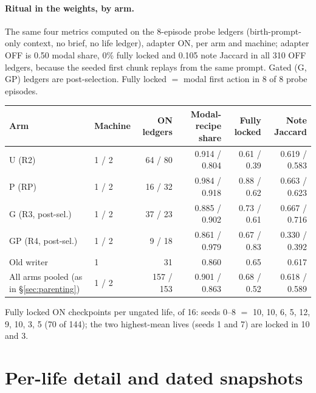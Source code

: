 \documentclass{article}
\begin{document}
\paragraph{Ritual in the weights, by arm.} The same four metrics computed on the 8-episode probe ledgers (birth-prompt-only context, no brief, no life ledger), adapter ON, per arm and machine; adapter OFF is 0.50 modal share, 0\% fully locked and 0.105 note Jaccard in all 310 OFF ledgers, because the seeded first chunk replays from the same prompt. Gated (G, GP) ledgers are post-selection. Fully locked $=$ modal first action in 8 of 8 probe episodes.
\begin{center}\footnotesize
\begin{tabular}{llrrrr}
\toprule
Arm & Machine & ON ledgers & Modal-recipe share & Fully locked & Note Jaccard \\
\midrule
U (R2) & 1 / 2 & 64 / 80 & 0.914 / 0.804 & 0.61 / 0.39 & 0.619 / 0.583 \\
P (RP) & 1 / 2 & 16 / 32 & 0.984 / 0.918 & 0.88 / 0.62 & 0.663 / 0.623 \\
G (R3, post-sel.) & 1 / 2 & 37 / 23 & 0.885 / 0.902 & 0.73 / 0.61 & 0.667 / 0.716 \\
GP (R4, post-sel.) & 1 / 2 & 9 / 18 & 0.861 / 0.979 & 0.67 / 0.83 & 0.330 / 0.392 \\
Old writer & 1 & 31 & 0.860 & 0.65 & 0.617 \\
All arms pooled (as in \S\ref{sec:parenting}) & 1 / 2 & 157 / 153 & 0.901 / 0.863 & 0.68 / 0.52 & 0.618 / 0.589 \\
\bottomrule
\end{tabular}
\end{center}
Fully locked ON checkpoints per ungated life, of 16: seeds 0--8 $=$ 10, 10, 6, 5, 12, 9, 10, 3, 5 (70 of 144); the two highest-mean lives (seeds 1 and 7) are locked in 10 and 3.

\section{Per-life detail and dated snapshots}
\label{app:lives}
\end{document}
